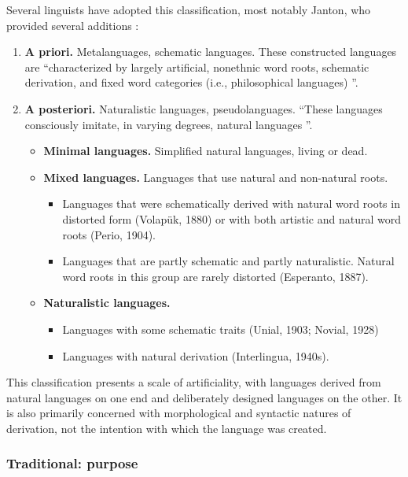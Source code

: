 \documentclass[14pt, a4paper]{extreport}
\begin{document}
Several linguists have adopted this classification, most notably Janton, who provided several additions \parencite[5]{janton}:

\begin{enumerate}
  \item \textbf{A priori.} Metalanguages, schematic languages. These constructed languages are ``characterized by largely artificial, nonethnic word roots, schematic derivation, and fixed word categories (i.e., philosophical languages) \parencite[6]{janton}''.
  \item \textbf{A posteriori.} Naturalistic languages, pseudolanguages. ``These languages consciously imitate, in varying degrees, natural languages \parencite[5]{janton}''.
  \begin{itemize}
    \item \textbf{Minimal languages.} Simplified natural languages, living or dead.
    \item \textbf{Mixed languages.} Languages that use natural and non-natural roots.
      \begin{itemize}
        \item Languages that were schematically derived with natural word roots in distorted form (Volapük, 1880) or with both artistic and natural word roots (Perio, 1904).
        \item Languages that are partly schematic and partly naturalistic. Natural word roots in this group are rarely distorted (Esperanto, 1887).
      \end{itemize}
  \item \textbf{Naturalistic languages.}
    \begin{itemize}
      \item Languages with some schematic traits (Unial, 1903; Novial, 1928)
      \item Languages with natural derivation (Interlingua, 1940s).
    \end{itemize}
  \end{itemize}
\end{enumerate}

This classification presents a scale of artificiality, with languages derived from natural languages on one end and deliberately designed languages on the other. It is also primarily concerned with morphological and syntactic natures of derivation, not the intention with which the language was created.

\subsubsection{Traditional: purpose}
\end{document}
